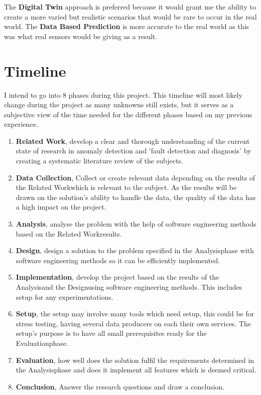 \documentclass[a4paper,8pt]{article}
\newcommand{\Phases}{8 }
\newcommand{\phaseq}{Related Work}
\newcommand{\phasew}{Data Collection}
\newcommand{\phasee}{Analysis}
\newcommand{\phaser}{Design}
\newcommand{\phaset}{Implementation}
\newcommand{\phaseSetup}{Setup}
\newcommand{\phasey}{Evaluation}
\newcommand{\phaseu}{Conclusion}
\begin{document}
		The \textbf{Digital Twin} approach is preferred because it would grant me the ability to create a more varied but realistic scenarios that would be rare to occur in the real world. The \textbf{Data Based Prediction} is more accurate to the real world as this was what real sensors would be giving as a result.
	\section{Timeline}
	I intend to go into \Phases phases during this project. This timeline will most likely change during the project as many unknowns still exists, but it serves as a subjective view of the time needed for the different phases based on my previous experience.
		\begin{enumerate}
			\item \textbf{\phaseq}, develop a clear and thorough understanding of the current state of research in anomaly detection and 'fault detection and diagnosis' by creating a systematic literature review of the subjects.
			\item \textbf{\phasew}, Collect or create relevant data depending on the results of the \phaseq \space which is relevant to the subject. As the results will be drawn on the solution's ability to handle the data, the quality of the data has a high impact on the project.
			\item \textbf{\phasee}, analyse the problem with the help of software engineering methods based on the \phaseq \space results.
			\item \textbf{\phaser}, design a solution to the problem specified in the \phasee \space phase with software engineering methods so it can be efficiently implemented.
			\item \textbf{\phaset}, develop the project based on the results of the \phasee \space and the \phaser \space using software engineering methods. This includes setup for any experimentations.
			\item \textbf{\phaseSetup}, the setup may involve many tools which need setup, this could be for stress testing, having several data producers on each their own services. The setup's purpose is to have all small prerequisites ready for the \phasey \space phase.
			\item \textbf{\phasey}, how well does the solution fulfil the requirements determined in the \phasee \space phase and does it implement all features which is deemed critical.
			\item \textbf{\phaseu}, Answer the research questions and draw a conclusion.
		\end{enumerate}
	
\end{document}
